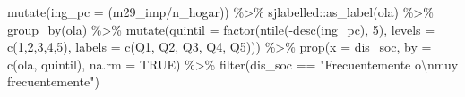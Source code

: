 \documentclass[
  12pt,
]{book}
\newenvironment{Shaded}{\begin{snugshade}}{\end{snugshade}}
\newcommand{\AttributeTok}[1]{\textcolor[rgb]{0.77,0.63,0.00}{#1}}
\newcommand{\ConstantTok}[1]{\textcolor[rgb]{0.00,0.00,0.00}{#1}}
\newcommand{\DecValTok}[1]{\textcolor[rgb]{0.00,0.00,0.81}{#1}}
\newcommand{\FunctionTok}[1]{\textcolor[rgb]{0.00,0.00,0.00}{#1}}
\newcommand{\NormalTok}[1]{#1}
\newcommand{\SpecialCharTok}[1]{\textcolor[rgb]{0.00,0.00,0.00}{#1}}
\newcommand{\StringTok}[1]{\textcolor[rgb]{0.31,0.60,0.02}{#1}}
\begin{document}
\begin{Shaded}
\begin{Highlighting}[]
  \FunctionTok{mutate}\NormalTok{(}\AttributeTok{ing\_pc =}\NormalTok{ (m29\_imp}\SpecialCharTok{/}\NormalTok{n\_hogar)) }\SpecialCharTok{\%\textgreater{}\%}
\NormalTok{  sjlabelled}\SpecialCharTok{::}\FunctionTok{as\_label}\NormalTok{(ola) }\SpecialCharTok{\%\textgreater{}\%} 
  \FunctionTok{group\_by}\NormalTok{(ola) }\SpecialCharTok{\%\textgreater{}\%} 
  \FunctionTok{mutate}\NormalTok{(}\AttributeTok{quintil =} \FunctionTok{factor}\NormalTok{(}\FunctionTok{ntile}\NormalTok{(}\SpecialCharTok{{-}}\FunctionTok{desc}\NormalTok{(ing\_pc), }\DecValTok{5}\NormalTok{), }\AttributeTok{levels =} \FunctionTok{c}\NormalTok{(}\DecValTok{1}\NormalTok{,}\DecValTok{2}\NormalTok{,}\DecValTok{3}\NormalTok{,}\DecValTok{4}\NormalTok{,}\DecValTok{5}\NormalTok{),}
         \AttributeTok{labels =} \FunctionTok{c}\NormalTok{(}\StringTok{\textquotesingle{}Q1\textquotesingle{}}\NormalTok{, }\StringTok{\textquotesingle{}Q2\textquotesingle{}}\NormalTok{, }\StringTok{\textquotesingle{}Q3\textquotesingle{}}\NormalTok{, }\StringTok{\textquotesingle{}Q4\textquotesingle{}}\NormalTok{, }\StringTok{\textquotesingle{}Q5\textquotesingle{}}\NormalTok{))) }\SpecialCharTok{\%\textgreater{}\%} 
  \FunctionTok{prop}\NormalTok{(}\AttributeTok{x =}\NormalTok{ dis\_soc, }\AttributeTok{by =} \FunctionTok{c}\NormalTok{(ola, quintil), }\AttributeTok{na.rm =} \ConstantTok{TRUE}\NormalTok{) }\SpecialCharTok{\%\textgreater{}\%} 
  \FunctionTok{filter}\NormalTok{(dis\_soc }\SpecialCharTok{==} \StringTok{"Frecuentemente o}\SpecialCharTok{\textbackslash{}n}\StringTok{muy frecuentemente"}\NormalTok{)}


\end{Highlighting}
\end{Shaded}
\end{document}

